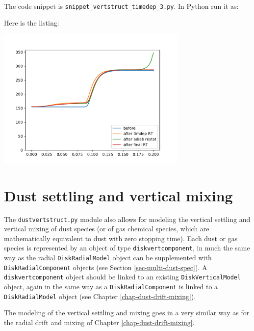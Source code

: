 \documentclass{book}
\newcommand{\code}[1]{{\small\tt #1}}
\begin{document}
The code snippet is
\code{snippet\_vertstruct\_timedep\_3.py}. In Python run it as:
\begin{codebox}
\end{codebox}
Here is the listing:

\centerline{\includegraphics[width=0.7\textwidth]{../snippets/fig_snippet_vertstruct_timedep_3_1.pdf}}


\section{Dust settling and vertical mixing}
The \code{dustvertstruct.py} module also allows for modeling the vertical
settling and vertical mixing of dust species (or of gas chemical species, which
are mathematically equivalent to dust with zero stopping time). Each dust or gas
species is represented by an object of type \code{diskvertcomponent}, in much
the same way as the radial \code{DiskRadialModel} object can be supplemented with
\code{DiskRadialComponent} objects (see Section \ref{sec-multi-dust-spec}).  A
\code{diskvertcomponent} object should be linked to an existing
\code{DiskVerticalModel} object, again in the same way as a \code{DiskRadialComponent} is
linked to a \code{DiskRadialModel} object (see Chapter \ref{chap-dust-drift-mixing}).

The modeling of the vertical settling and mixing goes in a very similar
way as for the radial drift and mixing of Chapter \ref{chap-dust-drift-mixing}.
\end{document}
